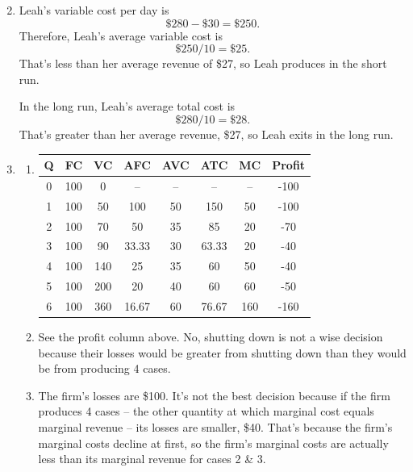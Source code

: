 \documentclass{article}
\begin{document}
\begin{enumerate}

\setcounter{enumi}{1}
\item Leah's variable cost per day is \[\$280 - \$30 = \$250.\] Therefore, Leah's average variable cost is \[\$250 / 10 = \$25.\] That's less than her average revenue of \$27, so Leah produces in the short run.

In the long run, Leah's average total cost is \[\$280 / 10 = \$28.\] That's greater than her average revenue, \$27, so Leah exits in the long run.

\setcounter{enumi}{3}
\item

	\begin{enumerate}
	
	\item \phantom{x}
	
		\begin{center}
		\begin{tabular}{| c | c | c | c | c | c | c | c |}
		\hline
		Q & FC & VC & AFC & AVC & ATC & MC & Profit \\
		\hline
		0 & 100 & 0 & -- & -- & -- & -- & -100 \\
		\hline
		1 & 100 & 50 & 100 & 50 & 150 & 50 & -100 \\
		\hline
		2 & 100 & 70 & 50 & 35 & 85 & 20 & -70\\
		\hline
		3 & 100 & 90 & 33.33 & 30 & 63.33 & 20 & -40 \\
		\hline
		4 & 100 & 140 & 25 & 35 & 60 & 50 & -40 \\
		\hline
		5 & 100 & 200 & 20 & 40 & 60 & 60 & -50\\
		\hline
		6 & 100 & 360 & 16.67 & 60 & 76.67 & 160 & -160\\
		\hline
		\end{tabular}
		\end{center}
		
	\item See the profit column above. No, shutting down is not a wise decision because their losses would be greater from shutting down than they would be from producing 4 cases.
	
	\item The firm's losses are \$100. It's not the best decision because if the firm produces 4 cases -- the other quantity at which marginal cost equals marginal revenue -- its losses are smaller, \$40. That's because the firm's marginal costs decline at first, so the firm's marginal costs are actually less than its marginal revenue for cases 2 \& 3. 
	

\end{enumerate}
\end{enumerate}
\end{document}
